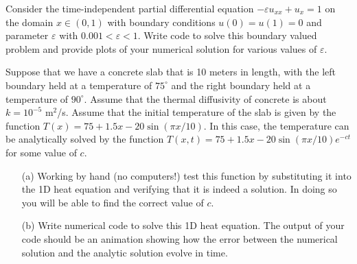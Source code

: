 

\begin{problem}
    Consider the time-independent partial differential equation $-\varepsilon u_{xx} +
    u_x = 1$ on the domain $x \in (0,1)$ with boundary conditions $u(0) = u(1) = 0$ and
    parameter $\varepsilon$ with $0.001<\varepsilon<1$.
    Write code to solve this boundary valued problem and provide plots of your numerical
    solution for various values of $\varepsilon$. 
\end{problem}


\begin{problem}
    Suppose that we have a concrete slab that is 10 meters in length, with the left
    boundary held at a temperature of $75^\circ$ and the right boundary held at a
    temperature of $90^\circ$.  Assume that the thermal diffusivity of concrete is about
    $k = 10^{-5}$ m$^2$/s.  Assume that the initial temperature of the slab is given by
    the function $T(x) = 75 + 1.5x - 20 \sin( \pi x / 10)$.  In this case, the temperature
    can be analytically solved by the function $T(x,t) = 75 + 1.5x - 20 \sin(\pi x / 10)
    e^{-ct}$ for some value of $c$.  
    \begin{enumerate}
        \item[(a)] Working by hand (no computers!) test this function by substituting it
            into the 1D heat equation and verifying that it is indeed a solution.  In
            doing so you will be able to find the correct value of $c$.
        \item[(b)] Write numerical code to solve this 1D heat equation.  The output of
            your code should be an animation showing how the error between the numerical
            solution and the analytic solution evolve in time.
    \end{enumerate}
\end{problem}

